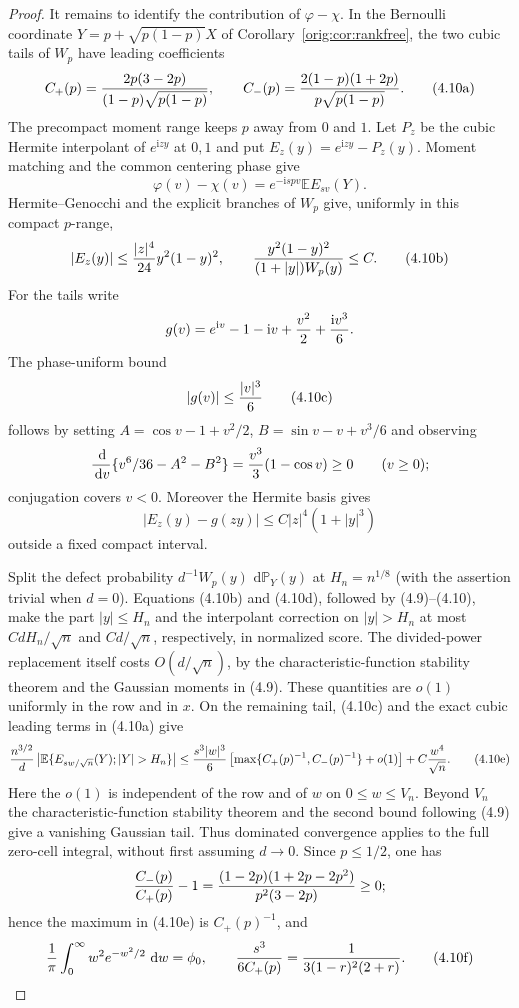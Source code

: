 \documentclass[11pt,a4paper]{article}
\numberwithin{equation}{section}
\theoremstyle{definition}
\theoremstyle{remark}
\newcommand{\E}{\mathbb E}
\newcommand{\Pp}{\mathbb P}
\newcommand{\ii}{\mathrm i}
\newcommand{\dd}{\,\mathrm d}
\begin{document}
\begin{proof}
It remains to identify the contribution of $\varphi-\chi$.  In the
Bernoulli coordinate $Y=p+\sqrt{p(1-p)}X$ of
Corollary~\ref{orig:cor:rankfree}, the two cubic tails of $W_p$ have leading
coefficients
\[
 C_+(p)={2p(3-2p)\over(1-p)\sqrt{p(1-p)}},\qquad
 C_-(p)={2(1-p)(1+2p)\over p\sqrt{p(1-p)}}.             \tag{4.10a}
\]
The precompact moment range keeps $p$ away from $0$ and $1$.  Let $P_z$
be the cubic Hermite interpolant of $e^{\ii zy}$ at $0,1$ and put
$E_z(y)=e^{\ii zy}-P_z(y)$.  Moment matching and the common centering
phase give
\[
 \varphi(v)-\chi(v)=e^{-\ii spv}\E E_{sv}(Y).
\]
Hermite--Genocchi and the explicit branches of $W_p$ give, uniformly in
this compact $p$-range,
\[
 |E_z(y)|\le {|z|^4\over24}y^2(1-y)^2,\qquad
 {y^2(1-y)^2\over(1+|y|)W_p(y)}\le C.                 \tag{4.10b}
\]
For the tails write
\[
 g(v)=e^{\ii v}-1-\ii v+{v^2\over2}+{\ii v^3\over6}.
\]
The phase-uniform bound
\[
                         |g(v)|\le {|v|^3\over6}       \tag{4.10c}
\]
follows by setting $A=\cos v-1+v^2/2$,
$B=\sin v-v+v^3/6$ and observing
\[
 {\dd\over\dd v}\{v^6/36-A^2-B^2\}
       ={v^3\over3}(1-\cos v)\ge0\qquad(v\ge0);
\]
conjugation covers $v<0$.  Moreover the Hermite basis gives
\[
 |E_z(y)-g(zy)|\le C|z|^4(1+|y|^3)                    \tag{4.10d}
\]
outside a fixed compact interval.

Split the defect probability
$d^{-1}W_p(y)\,\dd\Pp_Y(y)$ at $H_n=n^{1/8}$ (with the assertion
trivial when $d=0$).  Equations (4.10b) and (4.10d), followed by
(4.9)--(4.10), make the part $|y|\le H_n$ and the interpolant correction
on $|y|>H_n$ at most $CdH_n/\sqrt n$ and $Cd/\sqrt n$, respectively,
in normalized score.  The divided-power replacement itself costs
$O(d/\sqrt n)$, by the characteristic-function stability theorem and
the Gaussian moments in (4.9).  These quantities are $o(1)$ uniformly
in the row and in $x$.  On the remaining tail, (4.10c) and the exact cubic leading
terms in (4.10a) give
\[
 {n^{3/2}\over d}
 \left|\E\{E_{sw/\sqrt n}(Y);|Y|>H_n\}\right|
 \le {s^3|w|^3\over6}
       \left[\max\{C_+(p)^{-1},C_-(p)^{-1}\}+o(1)\right]
       +C{w^4\over\sqrt n}.                              \tag{4.10e}
\]
Here the $o(1)$ is independent of the row and of $w$ on
$0\le w\le V_n$.  Beyond $V_n$ the
characteristic-function stability theorem and the second bound following
(4.9) give a vanishing Gaussian tail.  Thus dominated convergence applies
to the full zero-cell integral, without first assuming $d\to0$.  Since
$p\le1/2$, one has
\[
 {C_-(p)\over C_+(p)}-1
 ={(1-2p)(1+2p-2p^2)\over p^2(3-2p)}\ge0;
\]
hence the maximum in (4.10e) is $C_+(p)^{-1}$, and
\[
 {1\over\pi}\int_0^\infty w^2e^{-w^2/2}\,\dd w=\phi_0,
 \qquad {s^3\over6C_+(p)}={1\over3(1-r)^2(2+r)}.        \tag{4.10f}
\]


\end{proof}
\end{document}
